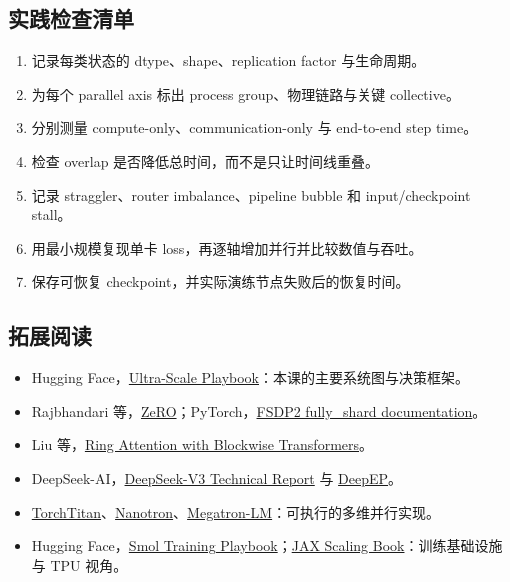 \documentclass[a4paper]{article}
\begin{document}
\subsection{实践检查清单}

\begin{enumerate}
  \item 记录每类状态的 dtype、shape、replication factor 与生命周期。
  \item 为每个 parallel axis 标出 process group、物理链路与关键 collective。
  \item 分别测量 compute-only、communication-only 与 end-to-end step time。
  \item 检查 overlap 是否降低总时间，而不是只让时间线重叠。
  \item 记录 straggler、router imbalance、pipeline bubble 和 input/checkpoint stall。
  \item 用最小规模复现单卡 loss，再逐轴增加并行并比较数值与吞吐。
  \item 保存可恢复 checkpoint，并实际演练节点失败后的恢复时间。
\end{enumerate}

\subsection{拓展阅读}

\begin{itemize}
  \item Hugging Face，\href{https://huggingface.co/spaces/nanotron/ultrascale-playbook}{Ultra-Scale Playbook}：本课的主要系统图与决策框架。
  \item Rajbhandari 等，\href{https://arxiv.org/abs/1910.02054}{ZeRO}；PyTorch，\href{https://docs.pytorch.org/docs/stable/distributed.fsdp.fully_shard.html}{FSDP2 fully\_shard documentation}。
  \item Liu 等，\href{https://arxiv.org/abs/2310.01889}{Ring Attention with Blockwise Transformers}。
  \item DeepSeek-AI，\href{https://arxiv.org/abs/2412.19437}{DeepSeek-V3 Technical Report} 与 \href{https://github.com/deepseek-ai/DeepEP}{DeepEP}。
  \item \href{https://github.com/pytorch/torchtitan}{TorchTitan}、\href{https://github.com/huggingface/nanotron}{Nanotron}、\href{https://github.com/NVIDIA/Megatron-LM}{Megatron-LM}：可执行的多维并行实现。
  \item Hugging Face，\href{https://huggingface.co/spaces/HuggingFaceTB/smol-training-playbook}{Smol Training Playbook}；\href{https://jax-ml.github.io/scaling-book/tpus/}{JAX Scaling Book}：训练基础设施与 TPU 视角。
\end{itemize}
\end{document}
